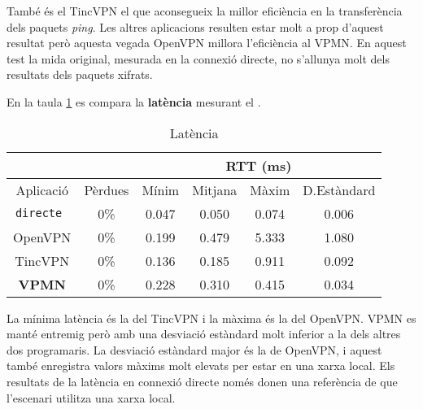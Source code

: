 També és el TincVPN el que aconsegueix la millor eficiència en la transferència dels paquets \emph{ping}. Les altres aplicacions resulten estar molt a prop d'aquest resultat però aquesta vegada OpenVPN millora l'eficiència al VPMN. En aquest test la mida original, mesurada en la connexió directe, no s'allunya molt dels resultats dels paquets xifrats.

En la taula \ref{T:lat} es compara la \textbf{latència} mesurant el .
\begin{table}[htb]
\begin{center}
\begin{tabular}{|c|c|c|c|c|c|}
\multicolumn{2}{c}{} & \multicolumn{4}{|c|}{RTT (ms)} \\ \hline
Aplicació & Pèrdues & Mínim & Mitjana & Màxim & D.Estàndard \\ \hline \hline
\tt directe & 0\% & 0.047 & 0.050 & 0.074 & 0.006 \\ \hline
OpenVPN & 0\% & 0.199 & 0.479 & 5.333 & 1.080 \\ \hline
TincVPN & 0\% & 0.136 & 0.185 & 0.911 & 0.092 \\ \hline
\bf VPMN & 0\% & 0.228 & 0.310 & 0.415 & 0.034 \\ \hline
\end{tabular}
\end{center}
\begin{center}
\caption{Latència}
\label{T:lat}
\end{center}
\end{table}
La mínima latència és la del TincVPN i la màxima és la del OpenVPN. VPMN es manté entremig però amb una desviació estàndard molt inferior a la dels altres dos programaris. La desviació estàndard major és la de OpenVPN, i aquest també enregistra valors màxims molt elevats per estar en una xarxa local. Els resultats de la latència en connexió directe només donen una referència de que l'escenari utilitza una xarxa local.

